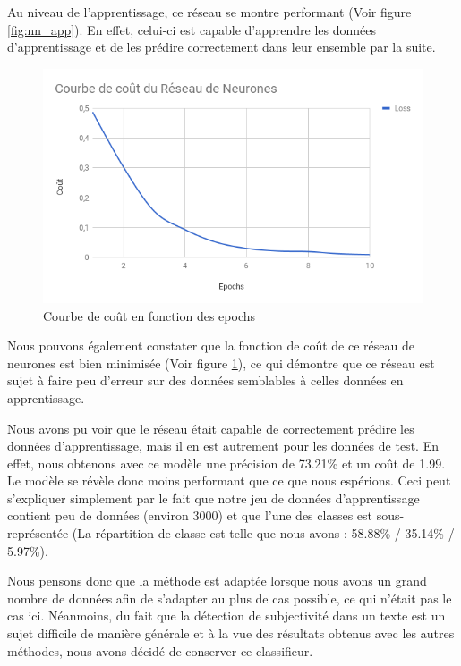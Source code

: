 \par Au niveau de l'apprentissage, ce réseau se montre performant (Voir figure \ref{fig:nn_app}). En effet, celui-ci est capable d'apprendre les données d'apprentissage et de les prédire correctement dans leur ensemble par la suite.

\begin{figure}
	\centering
	\includegraphics[scale=0.75]{./img/loss_nn_chart.png}
	\caption{Courbe de coût en fonction des epochs}
	\label{fig:nn_loss}
\end{figure}

\par Nous pouvons également constater que la fonction de coût de ce réseau de neurones est bien minimisée (Voir figure \ref{fig:nn_loss}), ce qui démontre que ce réseau est sujet à faire peu d'erreur sur des données semblables à celles données en apprentissage. 

\par Nous avons pu voir que le réseau était capable de correctement prédire les données d'apprentissage, mais il en est autrement pour les données de test. En effet, nous obtenons avec ce modèle une précision de 73.21\% et un coût de 1.99. Le modèle se révèle donc moins performant que ce que nous espérions. Ceci peut s'expliquer simplement par le fait que notre jeu de données d'apprentissage contient peu de données (environ 3000) et que l'une des classes est sous-représentée (La répartition de classe est telle que nous avons : 58.88\% / 35.14\% / 5.97\%).

\par Nous pensons donc que la méthode est adaptée lorsque nous avons un grand nombre de données afin de s'adapter au plus de cas possible, ce qui n'était pas le cas ici. Néanmoins, du fait que la détection de subjectivité dans un texte est un sujet difficile de manière générale et à la vue des résultats obtenus avec les autres méthodes, nous avons décidé de conserver ce classifieur.

